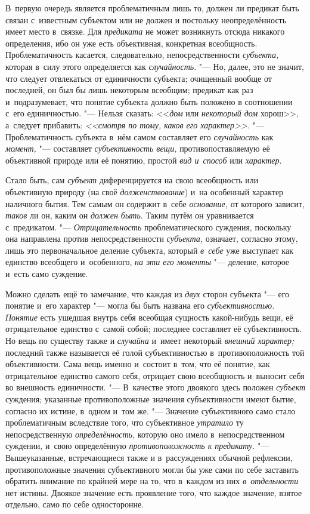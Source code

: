 \label{bkm:bm66a}В~первую очередь является проблематичным лишь
то, должен ли предикат быть связан с~известным субъектом или не должен и
постольку неопределённость имеет место в~связке. Для {\em предиката} не может
возникнуть отсюда никакого определения, ибо он уже есть объективная,
конкретная всеобщность. Проблематичность касается, следовательно,
непосредственности {\em субъекта,} которая в~силу этого определяется как
{\em случайность}. "--- Но,
далее, это не значит, что следует отвлекаться от единичности субъекта;
очищенный вообще от последней, он был бы лишь некоторым всеобщим; предикат
как раз и~подразумевает, что понятие субъекта должно быть положено в
соотношении с~его единичностью. "--- Нельзя сказать: <<{\em дом} или
{\em некоторый дом} хорош>>, а~следует прибавить: {\em <<смотря по тому,
каков его характер>>.} "--- Проблематичность субъекта в~нём самом
составляет его {\em случайность} как {\em момент,} "--- составляет
{\em субъективность вещи,} противопоставляемую её объективной природе
или её понятию, простой {\em вид и~способ} или {\em характер}.

Стало быть, сам {\em субъект} диференцируется на свою всеобщность или
объективную природу (на своё {\em долженствование})
и~на особенный характер наличного бытия. Тем самым он
содержит в~себе {\em основание,} от которого зависит, {\em таков} ли он,
каким он {\em должен быть}. Таким путём он уравнивается
с~предикатом. "--- {\em Отрицательность} проблематического суждения,
поскольку она направлена против непосредственности {\em субъекта,}
означает, согласно этому, лишь это первоначальное деление субъекта,
который {\em в~себе} уже выступает как единство всеобщего и~особенного,
{\em на эти его моменты} "--- деление, которое и~есть само суждение.

Можно сделать ещё то замечание, что каждая из {\em двух} сторон
субъекта "--- его понятие и~его характер "--- могла бы быть названа его
{\em субъективностью}. \label{bkm:bm01a}{\em Понятие}
есть ушедшая внутрь себя всеобщая сущность какой-нибудь вещи,
её отрицательное единство с~самой собой; последнее составляет её
субъективность. Но вещь по существу также и {\em случайна} и~имеет некоторый
{\em внешний характер;} последний также называется её голой субъективностью
в~противоположность той объективности. Сама вещь именно и~состоит в~том, что
её понятие, как отрицательное единство самого себя, отрицает свою
всеобщность и~выносит себя во внешность
единичности. "--- В~качестве этого двоякого здесь положен {\em субъект}
суждения; указанные противоположные значения субъективности имеют бытие,
согласно их истине, в~одном и~том же. "--- Значение субъективного само
стало проблематичным вследствие того, что субъективное {\em утратило} ту
непосредственную {\em определённость,} которую оно имело в~непосредственном
суждении, и~свою определённую {\em противоположность к
предикату}. "--- Вышеуказанные, встречающиеся также и
в~рассуждениях обычной рефлексии, противоположные значения субъективного
могли бы уже сами по себе заставить обратить внимание по крайней мере на
то, что в~каждом из них {\em в~отдельности} нет истины. Двоякое значение
есть проявление того, что каждое значение, взятое отдельно, само по себе
односторонне.

